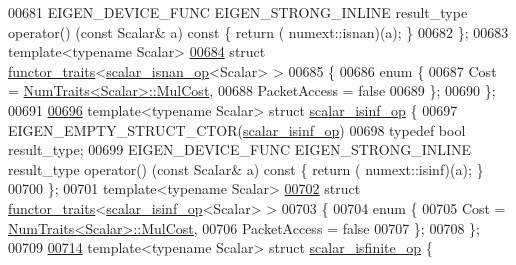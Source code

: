 \begin{DoxyCode}
00681   EIGEN\_DEVICE\_FUNC EIGEN\_STRONG\_INLINE result\_type operator() (\textcolor{keyword}{const} Scalar& a)\textcolor{keyword}{ const }\{ \textcolor{keywordflow}{return} (
      numext::isnan)(a); \}
00682 \};
00683 \textcolor{keyword}{template}<\textcolor{keyword}{typename} Scalar>
\hyperlink{struct_eigen_1_1internal_1_1functor__traits_3_01scalar__isnan__op_3_01_scalar_01_4_01_4}{00684} \textcolor{keyword}{struct }\hyperlink{struct_eigen_1_1internal_1_1functor__traits}{functor\_traits}<\hyperlink{struct_eigen_1_1internal_1_1scalar__isnan__op}{scalar\_isnan\_op}<Scalar> >
00685 \{
00686   \textcolor{keyword}{enum} \{
00687     Cost = \hyperlink{group___core___module_struct_eigen_1_1_num_traits}{NumTraits<Scalar>::MulCost},
00688     PacketAccess = \textcolor{keyword}{false}
00689   \};
00690 \};
00691 
\hyperlink{struct_eigen_1_1internal_1_1scalar__isinf__op}{00696} \textcolor{keyword}{template}<\textcolor{keyword}{typename} Scalar> \textcolor{keyword}{struct }\hyperlink{struct_eigen_1_1internal_1_1scalar__isinf__op}{scalar\_isinf\_op} \{
00697   EIGEN\_EMPTY\_STRUCT\_CTOR(\hyperlink{struct_eigen_1_1internal_1_1scalar__isinf__op}{scalar\_isinf\_op})
00698   \textcolor{keyword}{typedef} \textcolor{keywordtype}{bool} result\_type;
00699   EIGEN\_DEVICE\_FUNC EIGEN\_STRONG\_INLINE result\_type operator() (\textcolor{keyword}{const} Scalar& a)\textcolor{keyword}{ const }\{ \textcolor{keywordflow}{return} (
      numext::isinf)(a); \}
00700 \};
00701 \textcolor{keyword}{template}<\textcolor{keyword}{typename} Scalar>
\hyperlink{struct_eigen_1_1internal_1_1functor__traits_3_01scalar__isinf__op_3_01_scalar_01_4_01_4}{00702} \textcolor{keyword}{struct }\hyperlink{struct_eigen_1_1internal_1_1functor__traits}{functor\_traits}<\hyperlink{struct_eigen_1_1internal_1_1scalar__isinf__op}{scalar\_isinf\_op}<Scalar> >
00703 \{
00704   \textcolor{keyword}{enum} \{
00705     Cost = \hyperlink{group___core___module_struct_eigen_1_1_num_traits}{NumTraits<Scalar>::MulCost},
00706     PacketAccess = \textcolor{keyword}{false}
00707   \};
00708 \};
00709 
\hyperlink{struct_eigen_1_1internal_1_1scalar__isfinite__op}{00714} \textcolor{keyword}{template}<\textcolor{keyword}{typename} Scalar> \textcolor{keyword}{struct }\hyperlink{struct_eigen_1_1internal_1_1scalar__isfinite__op}{scalar\_isfinite\_op} \{

\end{DoxyCode}
